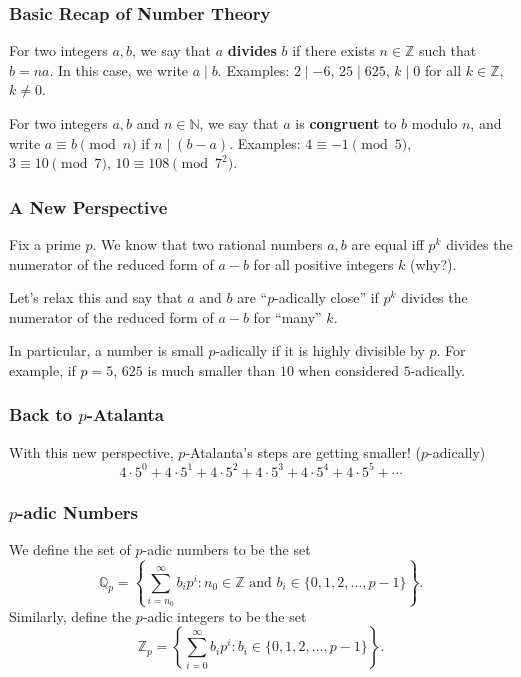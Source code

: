 \documentclass[10pt]{beamer}
\begin{document}
\begin{frame}
    \frametitle{Basic Recap of Number Theory}

    \begin{definition}
        For two integers \(a,b\), we say that \(a\) {\bf divides} \(b\) if there exists \(n\in\mathbb{Z}\) such that \(b=na\).
        In this case, we write \(a\mid b\).
        Examples: \(2\mid -6\), \(25\mid 625\), \(k\mid 0\) for all \(k\in\mathbb{Z}\), \(k\neq 0\).
    \end{definition}

    \begin{definition}
        For two integers \(a,b\) and \(n\in\mathbb{N}\), we say that \(a\) is {\bf congruent} to \(b\) modulo \(n\), and write \(a\equiv b\pmod{n}\) if \(n\mid(b-a)\).
        Examples: \(4\equiv -1\pmod{5}\), \(3\equiv 10\pmod{7}\), \(10\equiv 108\pmod 7^2\).
    \end{definition}

\end{frame}

\begin{frame}
    \frametitle{A New Perspective}

    Fix a prime \(p\).
    We know that two rational numbers \(a,b\) are equal iff \(p^k\) divides the numerator of the reduced form of \(a-b\) for all positive integers \(k\) (why?).

    Let's relax this and say that \(a\) and \(b\) are ``\(p\)-adically close'' if \(p^k\) divides the numerator of the reduced form of \(a-b\) for ``many'' \(k\).

    In particular, a number is small \(p\)-adically if it is highly divisible by \(p\).
    For example, if \(p=5\), \(625\) is much smaller than \(10\) when considered \(5\)-adically.

\end{frame}

\begin{frame}
    \frametitle{Back to \(p\)-Atalanta}

    With this new perspective, \(p\)-Atalanta's steps are getting smaller! (\(p\)-adically)
    \[4\cdot 5^0 + 4\cdot 5^1 + 4\cdot 5^2 + 4\cdot 5^3 + 4\cdot 5^4 + 4\cdot 5^5 + \cdots\]

\end{frame}

\begin{frame}
    \frametitle{\(p\)-adic Numbers}

    \begin{definition}
        We define the set of \(p\)-adic numbers to be the set
        \[\mathbb{Q}_p = \left\{\sum_{i=n_0}^\infty b_ip^i:n_0\in\mathbb{Z}\text{ and } b_i\in\{0,1,2,\ldots,p-1\}\right\}.\]
        Similarly, define the \(p\)-adic integers to be the set
        \[\mathbb{Z}_p = \left\{\sum_{i=0}^\infty b_ip^i:b_i\in\{0,1,2,\ldots,p-1\}\right\}.\]
    \end{definition}

\end{frame}
\end{document}
